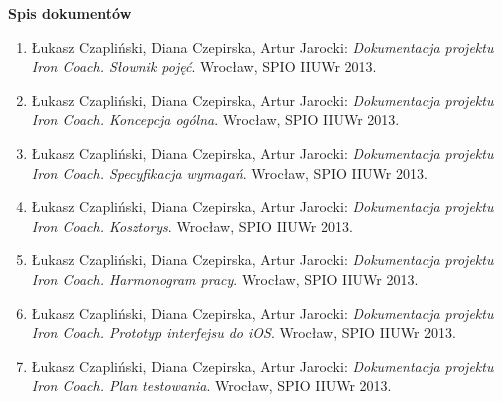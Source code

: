 


\newcommand{\quickbib}[1]{\item Łukasz Czapliński, Diana Czepirska, Artur Jarocki: {\it Dokumentacja projektu Iron Coach. #1}. Wrocław, SPIO IIUWr 2013.}

\vspace*{1cm}
{\textbf{\large{Spis dokumentów}}}\vspace{0.5cm}
\begin{enumerate}\itemsep5pt
      \quickbib{Słownik pojęć}
      \quickbib{Koncepcja ogólna}
      \quickbib{Specyfikacja wymagań}
      \quickbib{Kosztorys}
      \quickbib{Harmonogram pracy}
      \quickbib{Prototyp interfejsu do iOS}
      \quickbib{Plan testowania}
\end{enumerate}
\vfill


